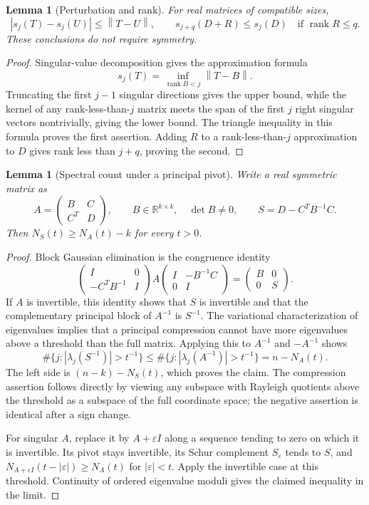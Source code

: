 \documentclass[11pt]{article}
\numberwithin{equation}{section}
\newtheorem{lemma}[theorem]{Lemma}
\theoremstyle{definition}\newtheorem{definition}[theorem]{Definition}
\theoremstyle{remark}\newtheorem{remark}[theorem]{Remark}
\newcommand{\R}{\mathbb R}\newcommand{\E}{\mathbb E}\newcommand{\PP}{\mathbb P}
\newcommand{\1}{\mathbf 1}\newcommand{\diag}{\operatorname{diag}}
\newcommand{\rank}{\operatorname{rank}}\newcommand{\tr}{\operatorname{tr}}
\newcommand{\norm}[1]{\left\lVert#1\right\rVert}\newcommand{\abs}[1]{\left|#1\right|}
\begin{document}
\begin{lemma}[Perturbation and rank]\label{lem:rank}
For real matrices of compatible sizes,
\begin{equation}\label{eq:rank-perturb}
 |s_j(T)-s_j(U)|\le\norm{T-U},\qquad
 s_{j+q}(D+R)\le s_j(D)\quad\text{if }\rank R\le q.
\end{equation}
These conclusions do not require symmetry.
\end{lemma}
\begin{proof}
Singular-value decomposition gives the approximation formula
\[s_j(T)=\inf_{\rank B<j}\norm{T-B}.\]
Truncating the first $j-1$ singular directions gives the upper bound, while the kernel of any rank-less-than-$j$ matrix meets the span of the first $j$ right singular vectors nontrivially, giving the lower bound. The triangle inequality in this formula proves the first assertion. Adding $R$ to a rank-less-than-$j$ approximation to $D$ gives rank less than $j+q$, proving the second.
\end{proof}

\begin{lemma}[Spectral count under a principal pivot]\label{lem:schur}
Write a real symmetric matrix as
\[
 A=\begin{pmatrix}B&C\\C^T&D\end{pmatrix},\qquad B\in\R^{k\times k},\quad\det B\ne0,
 \qquad S=D-C^TB^{-1}C.
\]
Then $N_S(t)\ge N_A(t)-k$ for every $t>0$.
\end{lemma}
\begin{proof}
Block Gaussian elimination is the congruence identity
\[
 \begin{pmatrix}I&0\\-C^TB^{-1}&I\end{pmatrix}
 A\begin{pmatrix}I&-B^{-1}C\\0&I\end{pmatrix}
 =\begin{pmatrix}B&0\\0&S\end{pmatrix}.
\]
If $A$ is invertible, this identity shows that $S$ is invertible and that the complementary principal block of $A^{-1}$ is $S^{-1}$. The variational characterization of eigenvalues implies that a principal compression cannot have more eigenvalues above a threshold than the full matrix. Applying this to $A^{-1}$ and $-A^{-1}$ shows
\[
 \#\{j:|\lambda_j(S^{-1})|>t^{-1}\}
 \le\#\{j:|\lambda_j(A^{-1})|>t^{-1}\}=n-N_A(t).
\]
The left side is $(n-k)-N_S(t)$, which proves the claim. The compression assertion follows directly by viewing any subspace with Rayleigh quotients above the threshold as a subspace of the full coordinate space; the negative assertion is identical after a sign change.

For singular $A$, replace it by $A+\varepsilon I$ along a sequence tending to zero on which it is invertible. Its pivot stays invertible, its Schur complement $S_\varepsilon$ tends to $S$, and
$N_{A+\varepsilon I}(t-|\varepsilon|)\ge N_A(t)$ for $|\varepsilon|<t$. Apply the invertible case at this threshold. Continuity of ordered eigenvalue moduli gives the claimed inequality in the limit.
\end{proof}
\end{document}
